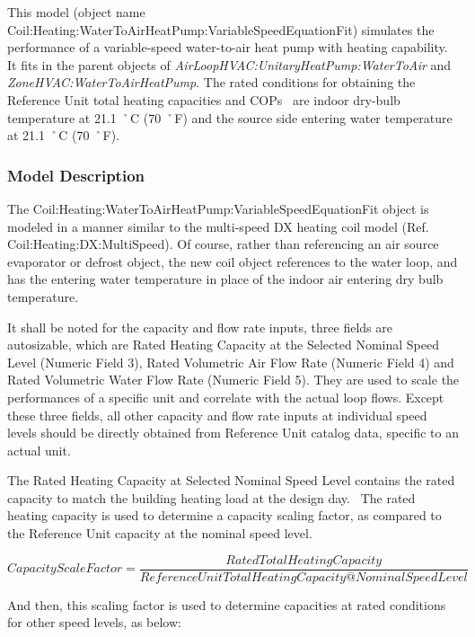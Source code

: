 This model (object name Coil:Heating:WaterToAirHeatPump:VariableSpeedEquationFit) simulates the performance of a variable-speed water-to-air heat pump with heating capability. It fits in the parent objects of \emph{AirLoopHVAC:UnitaryHeatPump:WaterToAir} and \emph{ZoneHVAC:WaterToAirHeatPump}. The rated conditions for obtaining the Reference Unit total heating capacities and COPs~ are indoor dry-bulb temperature at 21.1 ˚C (70 ˚F) and the source side entering water temperature at 21.1 ˚C (70 ˚F).

\subsubsection{Model Description}\label{model-description-10}

The Coil:Heating:WaterToAirHeatPump:VariableSpeedEquationFit object is modeled in a manner similar to the multi-speed DX heating coil model (Ref. Coil:Heating:DX:MultiSpeed). Of course, rather than referencing an air source evaporator or defrost object, the new coil object references to the water loop, and has the entering water temperature in place of the indoor air entering dry bulb temperature.

It shall be noted for the capacity and flow rate inputs, three fields are autosizable, which are Rated Heating Capacity at the Selected Nominal Speed Level (Numeric Field 3), Rated Volumetric Air Flow Rate (Numeric Field 4) and Rated Volumetric Water Flow Rate (Numeric Field 5). They are used to scale the performances of a specific unit and correlate with the actual loop flows. Except these three fields, all other capacity and flow rate inputs at individual speed levels should be directly obtained from Reference Unit catalog data, specific to an actual unit.

The Rated Heating Capacity at Selected Nominal Speed Level contains the rated capacity to match the building heating load at the design day.~ The rated heating capacity is used to determine a capacity scaling factor, as compared to the Reference Unit capacity at the nominal speed level.

{\scriptsize
\begin{equation}
CapacityScaleFactor = \frac{{RatedTotalHeatingCapacity}}{{ReferenceUnitTotalHeatingCapacity@NominalSpeedLevel}}
\end{equation}}

And then, this scaling factor is used to determine capacities at rated conditions for other speed levels, as below:

